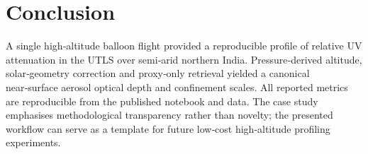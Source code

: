 \documentclass[11pt]{article}
\begin{document}
\section{Conclusion}
A single high‑altitude balloon flight provided a reproducible profile of relative UV attenuation in the UTLS over semi‑arid northern India.  Pressure‑derived altitude, solar‑geometry correction and proxy‑only retrieval yielded a canonical near‑surface aerosol optical depth and confinement scales.  All reported metrics are reproducible from the published notebook and data.  The case study emphasises methodological transparency rather than novelty; the presented workflow can serve as a template for future low‑cost high‑altitude profiling experiments.
\end{document}
